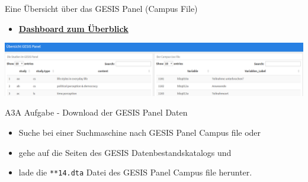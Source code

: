 \documentclass[ignorenonframetext,]{beamer}
\providecommand{\tightlist}{%
  \setlength{\itemsep}{0pt}\setlength{\parskip}{0pt}}
\begin{document}
\begin{frame}{Eine Übersicht über das GESIS Panel (Campus File)}

\begin{itemize}
\tightlist
\item
  \href{http://rpubs.com/Japhilko82/overview_gp}{\textbf{Dashboard zum
  Überblick}}
\end{itemize}

\includegraphics{figure/Dashboard_gesispanel.PNG}

\end{frame}

\begin{frame}[fragile]{A3A Aufgabe - Download der GESIS Panel Daten}

\begin{itemize}
\tightlist
\item
  Suche bei einer Suchmaschine nach GESIS Panel Campus file oder
\item
  gehe auf die Seiten des GESIS Datenbestandskatalogs und
\item
  lade die \texttt{**14.dta} Datei des GESIS Panel Campus file herunter.
\end{itemize}

\end{frame}
\end{document}
